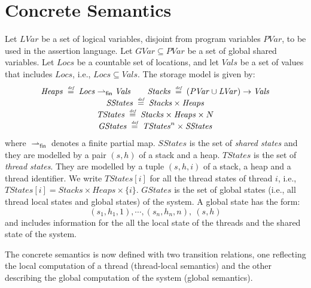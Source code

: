 \documentclass[a4paper,11pt]{llncs}
\newcommand{\lvars}{\mathit{LVar}}
\newcommand{\locs}{\mathit{Locs}}
\newcommand{\vals}{\mathit{Vals}}
\newcommand{\heaps}{\mathit{Heaps}}
\newcommand{\stacks}{\mathit{Stacks}}
\newcommand{\sstates}{\mathit{SStates}}
\newcommand{\tstates}{\mathit{TStates}}
\newcommand{\gstates}{\mathit{GStates}}
\newcommand{\vars}{\mathit{PVar}}
\newcommand{\gvars}{\mathit{GVar}}
\newcommand{\defeq}{\stackrel{\mbox{\tiny \it def}}{=}}
\newcommand{\fin}{\mathsf{fin}}
\newcounter{note_number}
\begin{document}
\section{Concrete Semantics}
\label{sec:concrete-semantics}
Let $\lvars$ be a set of logical
variables, disjoint from program variables $\vars$, to be used in the
assertion language. Let $\gvars \subseteq \vars$ be a set of global shared variables. 
Let $\locs$ be a countable set of
locations, and let $\vals$ be a set of values that includes
$\locs$, i.e., $\locs \subseteq \vals$. The storage model is given by:
\[
\begin{array}{c}
  \heaps \;\defeq\; \locs \rightharpoonup_\fin \vals
\qquad
  \stacks \;\defeq\; (\vars \cup \lvars) \rightarrow \vals
\\
  \sstates \;\defeq\; \stacks \times \heaps
  \\
   \tstates \;\defeq\; \stacks \times \heaps \times N 
   \\
      \gstates \;\defeq\; \tstates^n \times \sstates  
\end{array}
\]
where $\rightharpoonup_\fin$ denotes a finite partial map. 
 $\sstates$ is the set of  {\em shared states} and they   
  are modelled by a pair $(s,h)$ of a stack and a heap.
$\tstates$ is the set of 
{\em thread states}. They are modelled by a tuple $(s,h,i)$ of a stack, a heap and a thread
identifier. We write $\tstates[i]$ for all the thread states of thread $i$, i.e., $\tstates[i]= \stacks \times \heaps \times \{i\}$.
$\gstates$ is the set of global states (i.e., all thread local states and global states) of the system. A global state has the form:
\[
  (s_1,h_1,1),\cdots,(s_n,h_n,n),\ (s,h)
\]
and includes information for the all the local state of the threads and the shared state of the system.

The concrete semantics is now defined with two transition relations, one reflecting the local computation of a thread (thread-local semantics) and the other describing the global computation of the system (global semantics).
\end{document}
